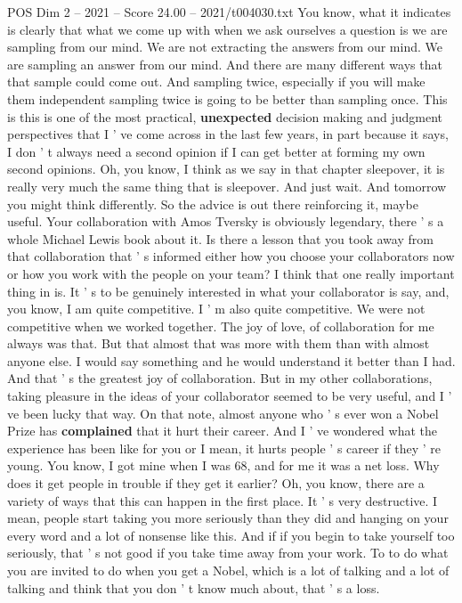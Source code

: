\begin{textsample}{POS Dim 2 – 2021 – Score 24.00 – 2021/t004030.txt}
You know, what it indicates is clearly that what we come up with when we ask ourselves a question is we are sampling from our mind.
We are not extracting the answers from our mind.
We are sampling an answer from our mind.
And there are many different ways that that sample could come out.
And sampling twice, especially if you will make them independent sampling twice is going to be better than sampling once.
This is this is one of the most practical, \textbf{unexpected} decision making and judgment perspectives that I ' ve come across in the last few years, in part because it says, I don ' t always need a second opinion if I can get better at forming my own second opinions.
Oh, you know, I think as we say in that chapter sleepover, it is really very much the same thing that is sleepover.
And just wait.
And tomorrow you might think differently.
So the advice is out there reinforcing it, maybe useful.
Your collaboration with Amos Tversky is obviously legendary, there ' s a whole Michael Lewis book about it.
Is there a lesson that you took away from that collaboration that ' s informed either how you choose your collaborators now or how you work with the people on your team?
I think that one really important thing in is.
It ' s to be genuinely interested in what your collaborator is say, and, you know, I am quite competitive.
I ' m also quite competitive.
We were not competitive when we worked together.
The joy of love, of collaboration for me always was that.
But that almost that was more with them than with almost anyone else.
I would say something and he would understand it better than I had.
And that ' s the greatest joy of collaboration.
But in my other collaborations, taking pleasure in the ideas of your collaborator seemed to be very useful, and I ' ve been lucky that way.
On that note, almost anyone who ' s ever won a Nobel Prize has \textbf{complained} that it hurt their career.
And I ' ve wondered what the experience has been like for you or I mean, it hurts people ' s career if they ' re young.
You know, I got mine when I was 68, and for me it was a net loss.
Why does it get people in trouble if they get it earlier?
Oh, you know, there are a variety of ways that this can happen in the first place.
It ' s very destructive.
I mean, people start taking you more seriously than they did and hanging on your every word and a lot of nonsense like this.
And if if you begin to take yourself too seriously, that ' s not good if you take time away from your work.
To to do what you are invited to do when you get a Nobel, which is a lot of talking and a lot of talking and think that you don ' t know much about, that ' s a loss.

\end{textsample}
